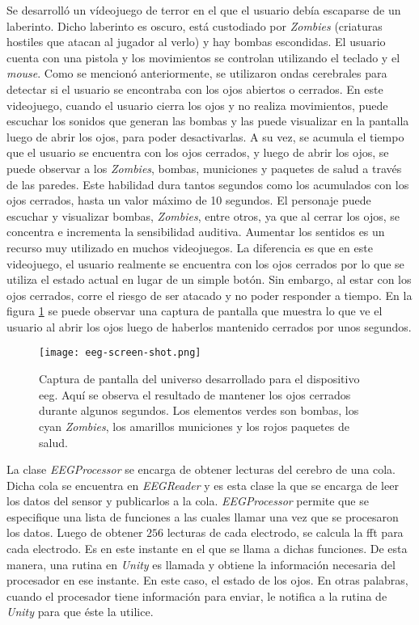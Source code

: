 Se desarrolló un vídeojuego de terror en el que el usuario debía escaparse de un laberinto. Dicho laberinto es oscuro, está custodiado por \emph{Zombies} (criaturas hostiles que atacan al jugador al verlo) y hay bombas escondidas. El usuario cuenta con una pistola y los movimientos se controlan utilizando el teclado y el \emph{mouse}. Como se mencionó anteriormente, se utilizaron ondas cerebrales para detectar si el usuario se encontraba con los ojos abiertos o cerrados. En este videojuego, cuando el usuario cierra los ojos y no realiza movimientos, puede escuchar los sonidos que generan las bombas y las puede visualizar en la pantalla luego de abrir los ojos, para poder desactivarlas. A su vez, se acumula el tiempo que el usuario se encuentra con los ojos cerrados, y luego de abrir los ojos, se puede observar a los \emph{Zombies}, bombas, municiones y paquetes de salud  a través de las paredes. Este habilidad dura tantos segundos como los acumulados con los ojos cerrados, hasta un valor máximo de 10 segundos. El personaje puede escuchar y visualizar bombas, \emph{Zombies}, entre otros, ya que al cerrar los ojos, se concentra e incrementa la sensibilidad auditiva. Aumentar los sentidos es un recurso muy utilizado en muchos videojuegos. La diferencia es que en este videojuego, el usuario realmente se encuentra con los ojos cerrados por lo que se utiliza el estado actual en lugar de un simple botón. Sin embargo, al estar con los ojos cerrados, corre el riesgo de ser atacado y no poder responder a tiempo. En la figura \ref{fig:eeg-screen-shot} se puede observar una captura de pantalla que muestra lo que ve el usuario al abrir los ojos luego de haberlos mantenido cerrados por unos segundos.

\begin{figure}[H]
	\centering
    \texttt{[image: eeg-screen-shot.png]}
    \caption{Captura de pantalla del universo desarrollado para el dispositivo \acrshort{eeg}. Aquí se observa el resultado de mantener los ojos cerrados durante algunos segundos.  Los elementos verdes son bombas, los cyan \emph{Zombies}, los amarillos municiones y los rojos paquetes de salud.}
	\label{fig:eeg-screen-shot}
\end{figure}

La clase \emph{EEGProcessor} se encarga de obtener lecturas del cerebro de una cola. Dicha cola se encuentra en \emph{EEGReader} y es esta clase la que se encarga de leer los datos del sensor y publicarlos a la cola. \emph{EEGProcessor} permite que se especifique una lista de funciones a las cuales llamar una vez que se procesaron los datos. Luego de obtener $256$ lecturas de cada electrodo, se calcula la \acrshort{fft} para cada electrodo. Es en este instante en el que se llama a dichas funciones. De esta manera, una rutina en \emph{Unity} es llamada y obtiene la información necesaria del procesador en ese instante. En este caso, el estado de los ojos. En otras palabras, cuando el procesador tiene información para enviar, le notifica a la rutina de \emph{Unity} para que éste la utilice.

